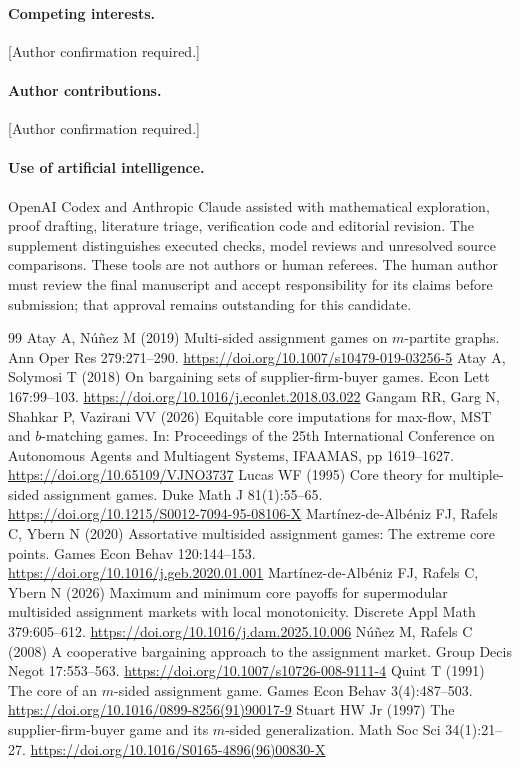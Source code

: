 \documentclass[11pt]{article}
\theoremstyle{remark}\newtheorem{remark}[theorem]{Remark}
\begin{document}
\paragraph{Competing interests.} [Author confirmation required.]
\paragraph{Author contributions.} [Author confirmation required.]
\paragraph{Use of artificial intelligence.}
OpenAI Codex and Anthropic Claude assisted with mathematical exploration,
proof drafting, literature triage, verification code and editorial revision.
The supplement distinguishes executed checks, model reviews and unresolved
source comparisons. These tools are not authors or human referees. The human
author must review the final manuscript and accept responsibility for its
claims before submission; that approval remains outstanding for this candidate.

\begin{thebibliography}{99}
\small\setlength{\itemsep}{1pt}
Atay A, N\'u\~nez M (2019) Multi-sided assignment games on $m$-partite graphs.
Ann Oper Res 279:271--290. \url{https://doi.org/10.1007/s10479-019-03256-5}
Atay A, Solymosi T (2018) On bargaining sets of supplier-firm-buyer games.
Econ Lett 167:99--103. \url{https://doi.org/10.1016/j.econlet.2018.03.022}
Gangam RR, Garg N, Shahkar P, Vazirani VV (2026) Equitable core imputations
for max-flow, MST and $b$-matching games. In: Proceedings of the 25th
International Conference on Autonomous Agents and Multiagent Systems,
IFAAMAS, pp 1619--1627. \url{https://doi.org/10.65109/VJNO3737}
Lucas WF (1995) Core theory for multiple-sided assignment games.
Duke Math J 81(1):55--65. \url{https://doi.org/10.1215/S0012-7094-95-08106-X}
Mart\'inez-de-Alb\'eniz FJ, Rafels C, Ybern N (2020) Assortative multisided
assignment games: The extreme core points. Games Econ Behav 120:144--153.
\url{https://doi.org/10.1016/j.geb.2020.01.001}
Mart\'inez-de-Alb\'eniz FJ, Rafels C, Ybern N (2026) Maximum and minimum core
payoffs for supermodular multisided assignment markets with local monotonicity.
Discrete Appl Math 379:605--612. \url{https://doi.org/10.1016/j.dam.2025.10.006}
N\'u\~nez M, Rafels C (2008) A cooperative bargaining approach to the assignment
market. Group Decis Negot 17:553--563.
\url{https://doi.org/10.1007/s10726-008-9111-4}
Quint T (1991) The core of an $m$-sided assignment game.
Games Econ Behav 3(4):487--503. \url{https://doi.org/10.1016/0899-8256(91)90017-9}
Stuart HW Jr (1997) The supplier-firm-buyer game and its $m$-sided generalization.
Math Soc Sci 34(1):21--27. \url{https://doi.org/10.1016/S0165-4896(96)00830-X}
\end{thebibliography}
\end{document}
